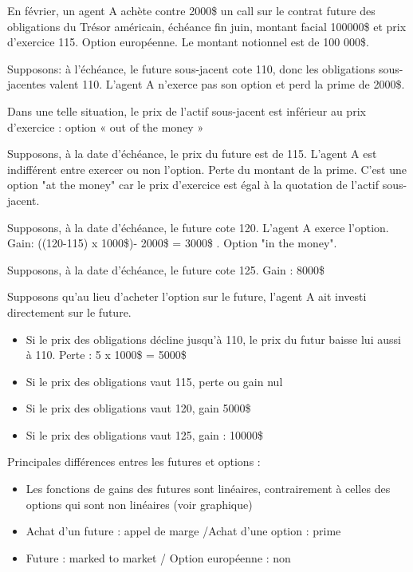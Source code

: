 	En février, un agent A achète contre 2000\$ un call sur le contrat future des obligations du Trésor américain, échéance fin juin, montant facial 100000\$ et prix d'exercice 115. Option européenne. Le montant notionnel est de 100 000\$.

Supposons: à l'échéance, le future sous-jacent cote 110, donc les obligations sous-jacentes valent 110. L'agent A n'exerce pas son option et perd la prime de 2000\$.

Dans une telle situation, le prix de l'actif sous-jacent est inférieur au prix d'exercice : option « out of the money » 

Supposons, à la date d'échéance, le prix du future est de 115. L'agent A est indifférent entre exercer ou non l'option. Perte du montant de la prime. C'est une option "at the money" car le prix d'exercice est égal à la quotation de l'actif sous-jacent.

Supposons, à la date d'échéance, le future cote 120. L'agent A exerce l'option. Gain: ((120-115) x 1000\$)- 2000\$ = 3000\$ . Option "in the money". 

Supposons, à la date d'échéance, le future cote 125. Gain : 8000\$

Supposons qu'au lieu d'acheter l'option sur le future, l'agent A ait investi directement sur le future. 

\begin{itemize}
	\item Si le prix des obligations décline jusqu'à 110, le prix du futur baisse lui aussi à 110. Perte : 5 x 1000\$ = 5000\$ 
	\item Si le prix des obligations vaut 115, perte ou gain nul 
	\item Si le prix des obligations vaut 120, gain 5000\$ 
	\item Si le prix des obligations vaut 125, gain : 10000\$
\end{itemize}


Principales différences entres les futures et options :

\begin{itemize}
	\item Les fonctions de gains des futures sont linéaires, contrairement à celles des 
options qui sont non linéaires (voir graphique) 
	\item Achat d'un future : appel de marge /Achat d'une option : prime 
	\item Future : marked to market / Option européenne : non
\end{itemize}

